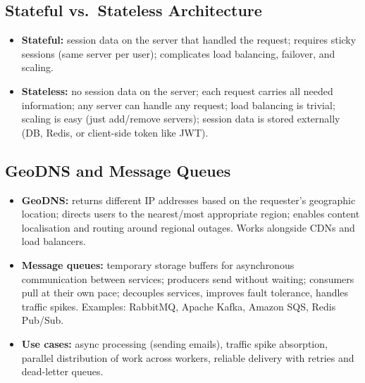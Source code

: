 \documentclass[hidelinks]{article}
\begin{document}
\subsection{Stateful vs.\ Stateless Architecture}
\begin{itemize}
  \item \textbf{Stateful:} session data on the server that handled the request; requires sticky sessions
        (same server per user); complicates load balancing, failover, and scaling.
  \item \textbf{Stateless:} no session data on the server; each request carries all needed information;
        any server can handle any request; load balancing is trivial; scaling is easy (just add/remove
        servers); session data is stored externally (DB, Redis, or client-side token like JWT).
\end{itemize}

\subsection{GeoDNS and Message Queues}
\begin{itemize}
  \item \textbf{GeoDNS:} returns different IP addresses based on the requester's geographic location;
        directs users to the nearest/most appropriate region; enables content localisation and routing
        around regional outages. Works alongside CDNs and load balancers.
  \item \textbf{Message queues:} temporary storage buffers for asynchronous communication between
        services; producers send without waiting; consumers pull at their own pace; decouples services,
        improves fault tolerance, handles traffic spikes.
        Examples: RabbitMQ, Apache Kafka, Amazon SQS, Redis Pub/Sub.
  \item \textbf{Use cases:} async processing (sending emails), traffic spike absorption, parallel
        distribution of work across workers, reliable delivery with retries and dead-letter queues.
\end{itemize}
\end{document}

